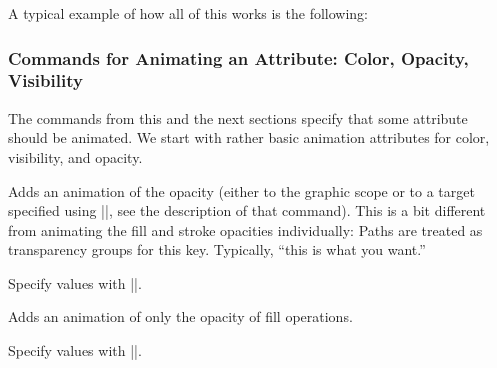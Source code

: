 A typical example of how all of this works is the following:
\begin{codeexample}
{
  \pgfsys@animatefillopacity%
}
{
  \pgfsys@animatelinewidth%
}
\end{codeexample}


\subsubsection{Commands for Animating an Attribute: Color, Opacity, Visibility}

The commands from this and the next sections specify that some
attribute should be animated. We start with rather basic animation
attributes for color, visibility, and opacity.

\begin{command}{\pgfsys@animateopacity}
  Adds an animation of the opacity (either to the graphic scope or to
  a target specified using |\string\pgfsys@animation@whom|, see the
  description of that command). This is a bit different from animating
  the fill and stroke opacities  individually: Paths are treated as
  transparency groups for this key. Typically, ``this is what you
  want.''
  
  Specify values with |\pgfsys@animation@scalar|.

\begin{codeexample}[width=2cm]
\end{codeexample}
\end{command}

\begin{command}{\pgfsys@animatefillopacity}
  Adds an animation of only the opacity of fill operations.
  
  Specify values with |\pgfsys@animation@scalar|.

\begin{codeexample}[width=2cm]
\end{codeexample}
\end{command}

